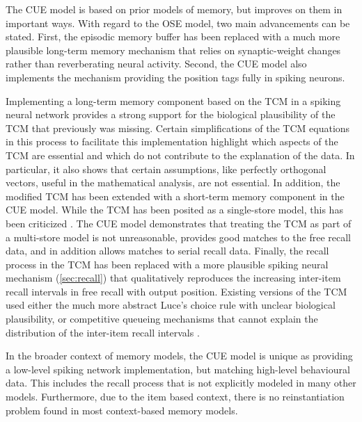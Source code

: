 The CUE model is based on prior models of memory, but improves on them in important ways.
With regard to the OSE model, two main advancements can be stated.
First, the episodic memory buffer has been replaced with a much more plausible long-term memory mechanism that relies on synaptic-weight changes rather than reverberating neural activity.
Second, the CUE model also implements the mechanism providing the position tags fully in spiking neurons.

Implementing a long-term memory component based on the TCM in a spiking neural network provides a strong support for the biological plausibility of the TCM that previously was missing.
Certain simplifications of the TCM equations in this process to facilitate this implementation highlight which aspects of the TCM are essential and which do not contribute to the explanation of the data.
In particular, it also shows that certain assumptions, like perfectly orthogonal vectors, useful in the mathematical analysis, are not essential.
In addition, the modified TCM has been extended with a short-term memory component in the CUE model.
While the TCM has been posited as a single-store model, this has been criticized \parencite{Davelaar2008}.
The CUE model demonstrates that treating the TCM as part of a multi-store model is not unreasonable, provides good matches to the free recall data, and in addition allows matches to serial recall data.
Finally, the recall process in the TCM has been replaced with a more plausible spiking neural mechanism (\cref{sec:recall}) that qualitatively reproduces the increasing inter-item recall intervals in free recall with output position.
Existing versions of the TCM used either the much more abstract Luce's choice rule with unclear biological plausibility, or competitive queueing mechanisms that cannot explain the distribution of the inter-item recall intervals \parencite{davelaar2007}.

In the broader context of memory models, the CUE model is unique as providing a low-level spiking network implementation, but matching high-level behavioural data.
This includes the recall process that is not explicitly modeled in many other models.
Furthermore, due to the item based context, there is no reinstantiation problem found in most context-based memory models.

